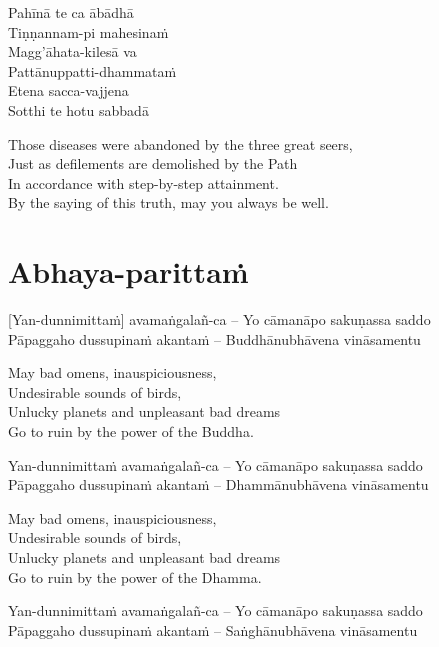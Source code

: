 Pahīnā te ca ābādhā\\
Tiṇṇannam-pi mahesinaṁ\\
Magg'āhata-kilesā va\\
Pattānuppatti-dhammataṁ\\
Etena sacca-vajjena\\
Sotthi te hotu sabbadā

\begin{english}
  Those diseases were abandoned by the three great seers,\\
  Just as defilements are demolished by the Path\\
  In accordance with step-by-step attainment.\\
  By the saying of this truth, may you always be well.
\end{english}

\suttaRef{[Thai]}

\section{Abhaya-parittaṁ}
\label{abhaya-parittam}
[Yan-dunnimittaṁ] avamaṅgalañ-ca – Yo cāmanāpo sakuṇassa saddo\\
Pāpaggaho dussupinaṁ akantaṁ – Buddhānubhāvena vināsamentu

\begin{english}
  May bad omens, inauspiciousness,\\
  Undesirable sounds of birds,\\
  Unlucky planets and unpleasant bad dreams\\
  Go to ruin by the power of the Buddha.
\end{english}

Yan-dunnimittaṁ avamaṅgalañ-ca – Yo cāmanāpo sakuṇassa saddo\\
Pāpaggaho dussupinaṁ akantaṁ – Dhammānubhāvena vināsamentu

\begin{english}
  May bad omens, inauspiciousness,\\
  Undesirable sounds of birds,\\
  Unlucky planets and unpleasant bad dreams\\
  Go to ruin by the power of the Dhamma.
\end{english}

Yan-dunnimittaṁ avamaṅgalañ-ca – Yo cāmanāpo sakuṇassa saddo\\
Pāpaggaho dussupinaṁ akantaṁ – Saṅghānubhāvena vināsamentu

